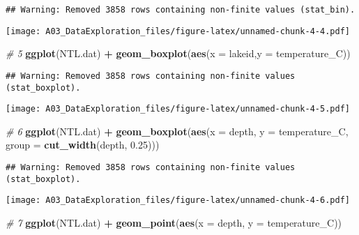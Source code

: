 \documentclass[]{article}
\newenvironment{Shaded}{\begin{snugshade}}{\end{snugshade}}
\newcommand{\KeywordTok}[1]{\textcolor[rgb]{0.13,0.29,0.53}{\textbf{#1}}}
\newcommand{\DataTypeTok}[1]{\textcolor[rgb]{0.13,0.29,0.53}{#1}}
\newcommand{\FloatTok}[1]{\textcolor[rgb]{0.00,0.00,0.81}{#1}}
\newcommand{\StringTok}[1]{\textcolor[rgb]{0.31,0.60,0.02}{#1}}
\newcommand{\CommentTok}[1]{\textcolor[rgb]{0.56,0.35,0.01}{\textit{#1}}}
\newcommand{\OperatorTok}[1]{\textcolor[rgb]{0.81,0.36,0.00}{\textbf{#1}}}
\newcommand{\NormalTok}[1]{#1}
\begin{document}
\begin{verbatim}
## Warning: Removed 3858 rows containing non-finite values (stat_bin).
\end{verbatim}

\texttt{[image: A03\_DataExploration\_files/figure-latex/unnamed-chunk-4-4.pdf]}

\begin{Shaded}
\begin{Highlighting}[]
\CommentTok{# 5}
\KeywordTok{ggplot}\NormalTok{(NTL.dat) }\OperatorTok{+}
\StringTok{  }\KeywordTok{geom_boxplot}\NormalTok{(}\KeywordTok{aes}\NormalTok{(}\DataTypeTok{x =}\NormalTok{ lakeid,}\DataTypeTok{y =}\NormalTok{ temperature_C))}
\end{Highlighting}
\end{Shaded}

\begin{verbatim}
## Warning: Removed 3858 rows containing non-finite values (stat_boxplot).
\end{verbatim}

\texttt{[image: A03\_DataExploration\_files/figure-latex/unnamed-chunk-4-5.pdf]}

\begin{Shaded}
\begin{Highlighting}[]
\CommentTok{# 6}
\KeywordTok{ggplot}\NormalTok{(NTL.dat) }\OperatorTok{+}
\StringTok{  }\KeywordTok{geom_boxplot}\NormalTok{(}\KeywordTok{aes}\NormalTok{(}\DataTypeTok{x =}\NormalTok{ depth, }\DataTypeTok{y =}\NormalTok{ temperature_C, }\DataTypeTok{group =} \KeywordTok{cut_width}\NormalTok{(depth, }\FloatTok{0.25}\NormalTok{)))}
\end{Highlighting}
\end{Shaded}

\begin{verbatim}
## Warning: Removed 3858 rows containing non-finite values (stat_boxplot).
\end{verbatim}

\texttt{[image: A03\_DataExploration\_files/figure-latex/unnamed-chunk-4-6.pdf]}

\begin{Shaded}
\begin{Highlighting}[]
\CommentTok{# 7 }
\KeywordTok{ggplot}\NormalTok{(NTL.dat) }\OperatorTok{+}
\StringTok{  }\KeywordTok{geom_point}\NormalTok{(}\KeywordTok{aes}\NormalTok{(}\DataTypeTok{x =}\NormalTok{ depth, }\DataTypeTok{y =}\NormalTok{ temperature_C))}
\end{Highlighting}
\end{Shaded}
\end{document}
